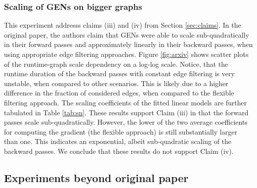 \subsubsection{Scaling of GENs on bigger graphs}
\label{exp:sn}
This experiment addresss claims (iii) and (iv) from Section \ref{sec:claims}. In the original paper, the authors claim that GENs were able to scale sub-quadratically in their forward passes and approximately linearly in their backward passes, when using appropriate edge filtering approaches. Figure \ref{fig:arxiv} shows scatter plots of the runtime-graph scale dependency on a log-log scale. Notice, that the runtime duration of the backward passes with constant edge filtering is very unstable, when compared to other scenarios. This is likely due to a higher difference in the fraction of considered edges, when compared to the flexible filtering approach. The scaling coefficients of the fitted linear models are further tabulated in Table \ref{tab:sn}. These results support Claim (iii) in that the forward passes scale sub-quadratically. However, the lower of the two average coefficients for computing the gradient (the flexible approach) is still substantially larger than one. This indicates an exponential, albeit sub-quadratic scaling of the backward passes. We conclude that these results do not support Claim (iv).

\subsection{Experiments beyond original paper}

\label{subsec:our}
 
